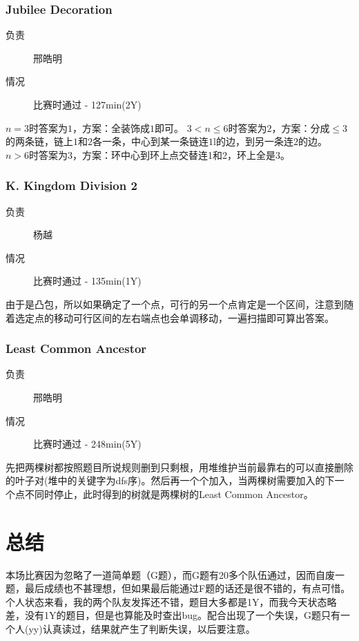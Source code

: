 \documentclass[a4paper, 11pt, nofonts, nocap, fancyhdr]{ctexart}
\newcommand{\problem}[1]{\subsubsection{#1}}
\begin{document}
\problem{Jubilee Decoration}

\begin{description}
\item[负责] 邢皓明
\item[情况] 比赛时通过 - 127min(2Y)
\end{description}

$n=3$时答案为$1$，方案：全装饰成$1$即可。
$3<n \leq 6$时答案为$2$，方案：分成$\leq 3$的两条链，链上$1$和$2$各一条，中心到某一条链连$1$l的边，到另一条连$2$的边。
$n > 6$时答案为3，方案：环中心到环上点交替连1和2，环上全是3。

\problem{K. Kingdom Division 2}

\begin{description}
\item[负责] 杨越
\item[情况] 比赛时通过 - 135min(1Y)
\end{description}

由于是凸包，所以如果确定了一个点，可行的另一个点肯定是一个区间，注意到随着选定点的移动可行区间的左右端点也会单调移动，一遍扫描即可算出答案。

\problem{Least Common Ancestor}

\begin{description}
\item[负责] 邢皓明
\item[情况] 比赛时通过 - 248min(5Y)
\end{description}

先把两棵树都按照题目所说规则删到只剩根，用堆维护当前最靠右的可以直接删除的叶子对(堆中的关键字为dfs序)。然后再一个个加入，当两棵树需要加入的下一个点不同时停止，此时得到的树就是两棵树的Least Common Ancestor。

\section{总结}

本场比赛因为忽略了一道简单题（G题），而G题有20多个队伍通过，因而自废一题，最后成绩也不甚理想，但如果最后能通过F题的话还是很不错的，有点可惜。个人状态来看，我的两个队友发挥还不错，题目大多都是1Y，而我今天状态略差，没有1Y的题目，但是也算能及时查出bug。配合出现了一个失误，G题只有一个人(yy)认真读过，结果就产生了判断失误，以后要注意。
\end{document}

